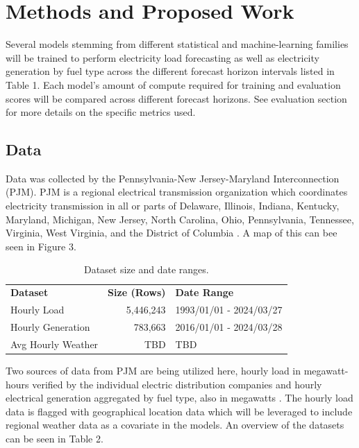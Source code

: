 \documentclass[sigconf]{acmart}
\begin{document}
\section{Methods and Proposed Work}
Several models stemming from different statistical and machine-learning families will be trained to perform electricity load forecasting as well as electricity generation by fuel type across the different forecast horizon intervals listed in Table 1. Each model's amount of compute required for training and evaluation scores will be compared across different forecast horizons. See evaluation section for more details on the specific metrics used.

  \subsection{Data}
  Data was collected by the Pennsylvania-New Jersey-Maryland Interconnection (PJM). PJM is a regional electrical transmission organization which coordinates electricity transmission in all or parts of Delaware, Illinois, Indiana, Kentucky, Maryland, Michigan, New Jersey, North Carolina, Ohio, Pennsylvania, Tennessee, Virginia, West Virginia, and the District of Columbia \cite{PJMZone24}. A map of this can bee seen in Figure 3.
  
  \begin{table}[hbt!]
\centering
\caption{Dataset size and date ranges.}
\begin{tabular}{lrl}
\toprule
\textbf{Dataset} & \hfil \textbf{Size (Rows)} & \textbf{Date Range} \\
\cmidrule(rl){1-1}\cmidrule(rl){2-2}\cmidrule(rl){3-3}
  Hourly Load & 5,446,243 & 1993/01/01 - 2024/03/27 \\
  Hourly Generation & 783,663 & 2016/01/01 - 2024/03/28 \\   
  Avg Hourly Weather & TBD & TBD  \\   
  \bottomrule
\end{tabular}
\end{table}
  
  Two sources of data from PJM are being utilized here, hourly load in megawatt-hours verified by the individual electric distribution companies and hourly electrical generation aggregated by fuel type, also in megawatts \cite{PJMLoad24}. The hourly load data is flagged with geographical location data which will be leveraged to include regional weather data as a covariate in the models. An overview of the datasets can be seen in Table 2.
  
\end{document}
